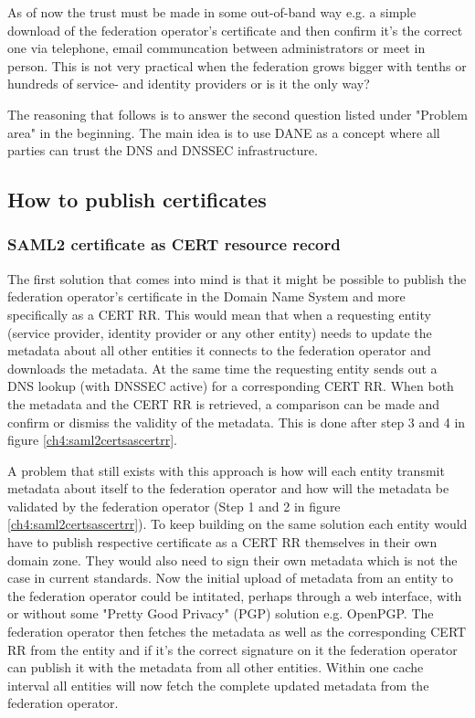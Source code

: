 As of now the trust must be made in some out-of-band way e.g. a simple download of the federation operator's certificate and then confirm it's the correct one via telephone, email communcation between administrators or meet in person.
This is not very practical when the federation grows bigger with tenths or hundreds of service- and identity providers or is it the only way?

The reasoning that follows is to answer the second question listed under "Problem area" in the beginning.
The main idea is to use DANE as a concept where all parties can trust the DNS and DNSSEC infrastructure.

\subsection{How to publish certificates}
\subsubsection{SAML2 certificate as CERT resource record}
\label{subsec:saml2-certificate-as-tlsa}
The first solution that comes into mind is that it might be possible to publish the federation operator's certificate in the Domain Name System and more specifically as a CERT RR\cite{rfc:4398}.
This would mean that when a requesting entity (service provider, identity provider or any other entity) needs to update the metadata about all other entities it connects to the federation operator and downloads the metadata.
At the same time the requesting entity sends out a DNS lookup (with DNSSEC active) for a corresponding CERT RR.
When both the metadata and the CERT RR is retrieved, a comparison can be made and confirm or dismiss the validity of the metadata.
This is done after step 3 and 4 in figure \ref{ch4:saml2certsascertrr}.

A problem that still exists with this approach is how will each entity transmit metadata about itself to the federation operator and how will the metadata be validated by the federation operator (Step 1 and 2 in figure \ref{ch4:saml2certsascertrr}).
To keep building on the same solution each entity would have to publish respective certificate as a CERT RR themselves in their own domain zone.
They would also need to sign their own metadata which is not the case in current standards. 
Now the initial upload of metadata from an entity to the federation operator could be intitated, perhaps through a web interface, with or without some "Pretty Good Privacy" (PGP) solution e.g. OpenPGP\cite{rfc:2440}.
The federation operator then fetches the metadata as well as the corresponding CERT RR from the entity and if it's the correct signature on it the federation operator can publish it with the metadata from all other entities.
Within one cache interval all entities will now fetch the complete updated metadata from the federation operator.

